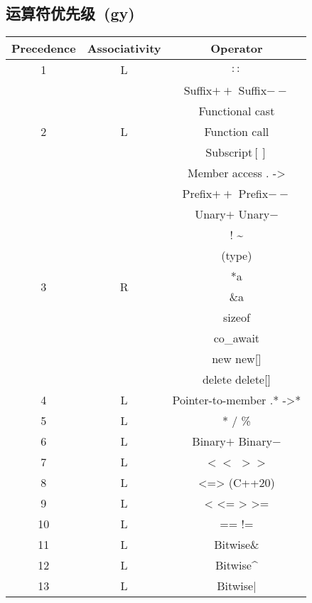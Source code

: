     \subsection*{运算符优先级\ \small(gy)}
        \begin{tabular}{|c|c|c|}
            \hline
            Precedence & Associativity & Operator\\
            \hline
            1 & L & $ :: $ \\
            \hline
            \multirow{5}{*}{2} & \multirow{5}{*}{L} & Suffix$ ++ $ Suffix$ -- $ \\
            && Functional cast \\
            && Function call \\
            && Subscript$ [] $ \\
            && Member access . -> \\
            \hline
            \multirow{10}{*}{3} & \multirow{10}{*}{R} & Prefix$ ++ $ Prefix$ -- $ \\
            && Unary$ + $ Unary$ - $ \\
            && ! \~{} \\
            && (type) \\
            && *a \\
            && \&a \\
            && sizeof \\
            && co\_await \\
            && new new[] \\
            && delete delete[] \\
            \hline
            4 & L & Pointer-to-member .* ->* \\
            \hline
            5 & L & * / \% \\
            \hline
            6 & L & Binary$ + $ Binary$ - $ \\
            \hline
            7 & L & $<<$ $>>$ \\
            \hline
            8 & L & <=> (C++20) \\
            \hline
            9 & L & < <= > >= \\
            \hline
            10 & L & == != \\
            \hline
            11 & L & Bitwise\& \\
            \hline
            12 & L & Bitwise\^{} \\
            \hline
            13 & L & Bitwise| \\

\end{tabular}

